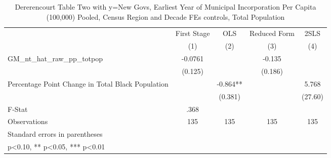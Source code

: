 \begin{table}[htbp]\centering
\def\sym#1{\ifmmode^{#1}\else\(^{#1}\)\fi}
\caption{Dererencourt Table Two with y=New Govs, Earliest Year of Municipal Incorporation Per Capita (100,000) Pooled, Census Region and Decade FEs controls, Total Population}
\begin{tabular}{l*{4}{c}}
\toprule
                    & First Stage   &         OLS   &Reduced Form   &        2SLS   \\
                    &\multicolumn{1}{c}{(1)}   &\multicolumn{1}{c}{(2)}   &\multicolumn{1}{c}{(3)}   &\multicolumn{1}{c}{(4)}   \\
\midrule
GM\_nt\_hat\_raw\_pp\_totpop&     -0.0761   &               &      -0.135   &               \\
                    &     (0.125)   &               &     (0.186)   &               \\
\addlinespace
Percentage Point Change in Total Black Population&               &      -0.864** &               &       5.768   \\
                    &               &     (0.381)   &               &     (27.60)   \\
\midrule
F-Stat              &        .368   &               &               &               \\
Observations        &         135   &         135   &         135   &         135   \\
\bottomrule
\multicolumn{5}{l}{\footnotesize Standard errors in parentheses}\\
\multicolumn{5}{l}{\footnotesize * p<0.10, ** p<0.05, *** p<0.01}\\
\end{tabular}
\end{table}
